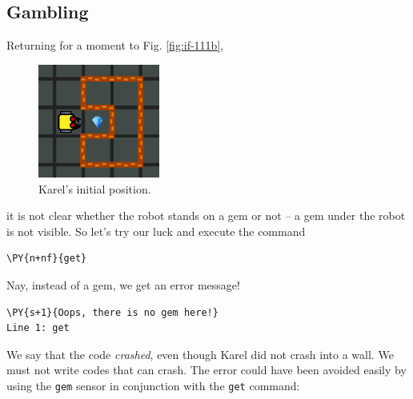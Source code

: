 \subsection{Gambling}

Returning for a moment to Fig. \ref{fig:if-111b},


\begin{figure}[!ht]
\begin{center}
\includegraphics[width=4cm]{img/if-111.png}
\vspace{-0mm}
\caption{Karel's initial position.}
\label{fig:if-111c}
\vspace{-6mm}
\end{center}
\end{figure}
\noindent
it is not clear whether 
the robot stands on a gem or not -- a gem under the robot is not visible.
So let's try our luck and execute the command\\

\begin{bbox}
\begin{Verbatim}[commandchars=\\\{\}]
\PY{n+nf}{get}
\end{Verbatim}
\end{bbox}
\vspace{6mm}

\noindent
Nay, instead of a gem, we get an error message!\\

\begin{ybox}
\begin{Verbatim}[commandchars=\\\{\}]
\PY{s+1}{Oops, there is no gem here!}
Line 1: get
\end{Verbatim}
\end{ybox}
\vspace{6mm}

\noindent
We say that the code {\em crashed}, even though Karel did not crash into a wall.
We must not write codes that can crash. The error could have been avoided easily 
by using the {\tt gem} sensor in conjunction with the {\tt get} command:\\

